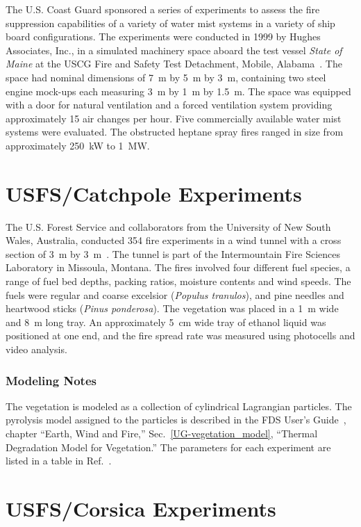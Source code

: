 The U.S. Coast Guard sponsored a series of experiments to assess the fire suppression capabilities of a variety of water mist systems in a variety of ship board configurations. The experiments were conducted in 1999 by Hughes Associates, Inc., in a simulated machinery space aboard the test vessel {\em State of Maine} at the USCG Fire and Safety Test Detachment, Mobile, Alabama~\cite{Back:USCG1999}. The space had nominal dimensions of 7~m by 5~m by 3~m, containing two steel engine mock-ups each measuring 3~m by 1~m by 1.5~m. The space was equipped with a door for natural ventilation and a forced ventilation system providing approximately 15 air changes per hour. Five commercially available water mist systems were evaluated. The obstructed heptane spray fires ranged in size from approximately 250~kW to 1~MW.


\section{USFS/Catchpole Experiments}
\label{USFS_Catchpole_Description}

The U.S. Forest Service and collaborators from the University of New South Wales, Australia, conducted 354 fire experiments in a wind tunnel with a cross section of 3~m by 3~m~\cite{Catchpole:CST1998}. The tunnel is part of the Intermountain Fire Sciences Laboratory in Missoula, Montana. The fires involved four different fuel species, a range of fuel bed depths, packing ratios, moisture contents and wind speeds. The fuels were regular and coarse excelsior ({\em Populus tranulos}), and pine needles and heartwood sticks ({\em Pinus ponderosa}). The vegetation was placed in a 1~m wide and 8~m long tray. An approximately 5~cm wide tray of ethanol liquid was positioned at one end, and the fire spread rate was measured using photocells and video analysis.

\subsubsection{Modeling Notes}

The vegetation is modeled as a collection of cylindrical Lagrangian particles. The pyrolysis model assigned to the particles is described in the FDS User's Guide~\cite{FDS_Users_Guide}, chapter ``Earth, Wind and Fire,'' Sec.~\ref{UG-vegetation_model}, ``Thermal Degradation Model for Vegetation.'' The parameters for each experiment are listed in a table in Ref.~\cite{Catchpole:CST1998}.


\section{USFS/Corsica Experiments}
\label{USFS_Corsica_Description}

